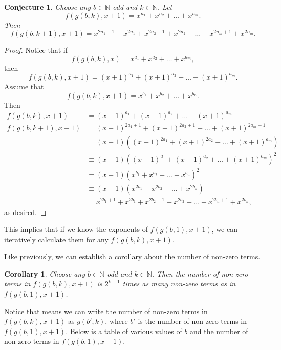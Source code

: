 \documentclass{article}
\newtheorem{corollary}{Corollary}
\newtheorem{conjecture}{Conjecture}
\newcommand{\N}{\mathbb{N}}
\begin{document}
	\newpage
	\begin{conjecture}
		Choose any $b \in \N$ odd and $k \in \N$.
		Let
		\begin{equation*}
			f(g(b,k),x+1) = x^{n_1} + x^{n_2} + \dots + x^{n_m}.
		\end{equation*}
		Then
		\begin{equation*}
			f(g(b,k+1),x+1) = x^{2n_1 + 1} + x^{2n_1} + x^{2n_2 + 1} + x^{2n_2} + \dots + x^{2n_m + 1} + x^{2n_m}.
		\end{equation*}
	\end{conjecture}
	\begin{proof}
		Notice that if
		\begin{equation*}
			f(g(b,k),x) = x^{a_1} + x^{a_2} + \dots + x^{a_m},
		\end{equation*}
		then
		\begin{equation*}
			f(g(b,k),x+1) = (x+1)^{a_1} + (x+1)^{a_2} + \dots + (x+1)^{a_m}.
		\end{equation*}
		Assume that
		\begin{equation*}
			f(g(b,k),x+1) = x^{b_1} + x^{b_2} + \dots + x^{b_n}.
		\end{equation*}
		Then
		\begin{align*}
			f(g(b,k),x+1) &= (x+1)^{a_1} + (x+1)^{a_2} + \dots + (x+1)^{a_m} \\
			f(g(b,k+1),x+1) &= (x+1)^{2a_1 + 1} + (x+1)^{2a_2 + 1} + \dots + (x+1)^{2a_m + 1} \\
			&= (x+1)\left((x+1)^{2a_1} + (x+1)^{2a_2} + \dots + (x+1)^{a_m}\right) \\
			&\equiv (x+1)\left((x+1)^{a_1} + (x+1)^{a_2} + \dots + (x+1)^{a_m}\right)^2 \\
			&= (x+1)\left(x^{b_1} + x^{b_2} + \dots + x^{b_n}\right)^2 \\
			&\equiv (x+1)\left(x^{2b_1} + x^{2b_2} + \dots + x^{2b_n}\right) \\
			&= x^{2b_1 + 1} + x^{2b_1} + x^{2b_2 + 1} + x^{2b_2} + \dots + x^{2b_n + 1} + x^{2b_n},
		\end{align*}
		as desired.
	\end{proof}

	This implies that if we know the exponents of $f(g(b,1),x+1)$, we can iteratively calculate them for any $f(g(b,k),x+1)$.
	
	Like previously, we can establish a corollary about the number of non-zero terms.
	\begin{corollary}
		Choose any $b \in \N$ odd and $k \in \N$.
		Then the number of non-zero terms in $f(g(b,k),x+1)$ is $2^{k-1}$ times as many non-zero terms as in $f(g(b,1),x+1)$.
	\end{corollary}
	Notice that means we can write the number of non-zero terms in $f(g(b,k),x+1)$ as $g(b',k)$, where $b'$ is the number of non-zero terms in $f(g(b,1),x+1)$.
	Below is a table of various values of $b$ and the number of non-zero terms in $f(g(b,1),x+1)$.
	
\end{document}
